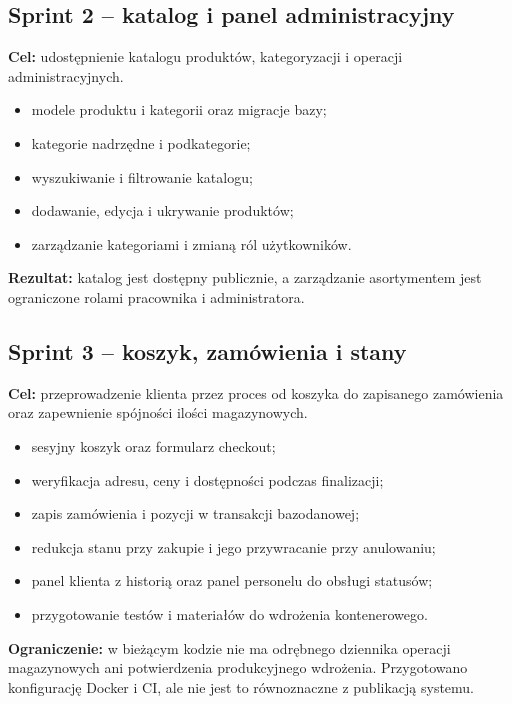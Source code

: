 \documentclass[12pt,a4paper]{article}
\begin{document}
\subsection{Sprint 2 -- katalog i panel administracyjny}
\textbf{Cel:} udostępnienie katalogu produktów, kategoryzacji i operacji
administracyjnych.
\begin{itemize}[leftmargin=*]
    \item modele produktu i kategorii oraz migracje bazy;
    \item kategorie nadrzędne i podkategorie;
    \item wyszukiwanie i filtrowanie katalogu;
    \item dodawanie, edycja i ukrywanie produktów;
    \item zarządzanie kategoriami i zmianą ról użytkowników.
\end{itemize}
\textbf{Rezultat:} katalog jest dostępny publicznie, a zarządzanie asortymentem
jest ograniczone rolami pracownika i administratora.

\subsection{Sprint 3 -- koszyk, zamówienia i stany}
\textbf{Cel:} przeprowadzenie klienta przez proces od koszyka do zapisanego
zamówienia oraz zapewnienie spójności ilości magazynowych.
\begin{itemize}[leftmargin=*]
    \item sesyjny koszyk oraz formularz checkout;
    \item weryfikacja adresu, ceny i dostępności podczas finalizacji;
    \item zapis zamówienia i pozycji w transakcji bazodanowej;
    \item redukcja stanu przy zakupie i jego przywracanie przy anulowaniu;
    \item panel klienta z historią oraz panel personelu do obsługi statusów;
    \item przygotowanie testów i materiałów do wdrożenia kontenerowego.
\end{itemize}
\textbf{Ograniczenie:} w bieżącym kodzie nie ma odrębnego dziennika operacji
magazynowych ani potwierdzenia produkcyjnego wdrożenia. Przygotowano
konfigurację Docker i CI, ale nie jest to równoznaczne z publikacją systemu.
\end{document}
